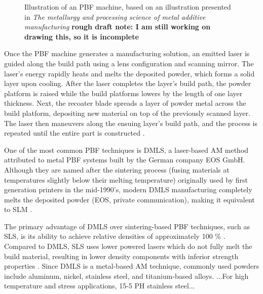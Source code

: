 \begin{figure}[H]
	\centering
    \caption{Illustration of an \gls{PBF} machine, based on an illustration presented in \textit{The metallurgy and processing science of metal additive manufacturing} \cite{OverviewofAM_OHara} 
    \textbf{rough draft note: I am still working on drawing this, so it is incomplete}}
	\label{fig:2_PBF_Setup}
\end{figure}
%

Once the \gls{PBF} machine generates a manufacturing solution, an emitted laser is guided along the build path using a lens configuration and scanning mirror. The laser's energy rapidly heats and melts the deposited powder, which forms a solid layer upon cooling. After the laser completes the layer's build path, the powder platform is raised while the build platforms lowers by the length of one layer thickness. Next, the recoater blade spreads a layer of powder metal across the build platform, depositing new material on top of the previously scanned layer. The laser then maneuvers along the ensuing layer's build path, and the process is repeated until the entire part is constructed \cite{OverviewofAM_OHara}.

One of the most common \gls{PBF} techniques is \gls{DMLS}, a laser-based \gls{AM} method attributed to metal \gls{PBF} systems built by the German company EOS GmbH. Although they are named after the sintering process (fusing materials at temperatures slightly below their melting temperature) originally used by first generation printers in the mid-1990's, modern \gls{DMLS} manufacturing completely melts the deposited powder (EOS, private communication), making it equivalent to \gls{SLM} \cite{EOS_DMLS_History}.  

The primary advantage of \gls{DMLS} over sintering-based \gls{PBF} techniques, such as \gls{SLS}, is its ability to achieve relative densities of approximately 100 \% \cite{EOS_StainlessSteel_M290}. Compared to \gls{DMLS}, \gls{SLS} uses lower powered lasers which do not fully melt the build material, resulting in lower density components with inferior strength properties \cite{SLS_not_fully_dense}. Since \gls{DMLS} is a metal-based \gls{AM} technique, commonly used powders include aluminum, nickel, stainless steel, and titanium-based alloys. ...For high temperature and stress applications, 15-5 \gls{PH} stainless steel...

